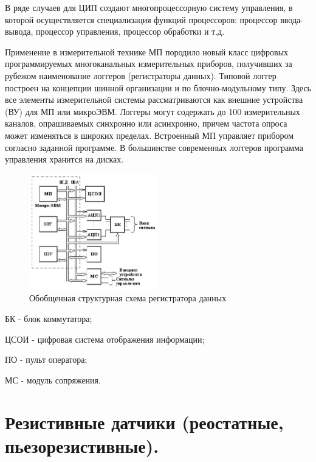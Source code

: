 \documentclass[unicode, 12pt, a4paper, oneside]{article}
\begin{document}
В ряде случаев для ЦИП создают многопроцессорную систему управления, в которой осуществляется специализация функций процессоров: процессор ввода-вывода, процессор управления, процессор обработки и т.д.

Применение в измерительной технике МП породило новый класс цифровых программируемых многоканальных измерительных приборов, получивших за рубежом наименование логгеров (регистраторы данных). Типовой логгер построен на концепции шинной организации и по блочно-модульному типу. Здесь все элементы измерительной системы рассматриваются как внешние устройства (ВУ) для МП или микроЭВМ. Логгеры могут содержать до 100 измерительных каналов, опрашиваемых синхронно или асинхронно, причем частота опроса может изменяться в широких пределах. Встроенный МП управляет прибором согласно заданной программе. В большинстве современных логгеров программа управления хранится на дисках.

\begin{figure}[H]
\centering
\includegraphics[width=0.5\textwidth]{56.jpg}
\caption{Обобщенная структурная схема регистратора данных}
\end{figure}
БК - блок коммутатора;

ЦСОИ - цифровая система отображения информации;

ПО - пульт оператора;

МС - модуль сопряжения.

\section{Резистивные датчики (реостатные, пьезорезистивные).}
\end{document}
